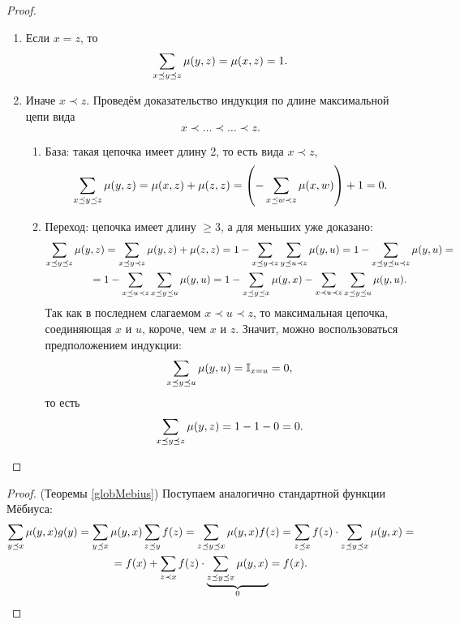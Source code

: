 \begin{proof}~
	\begin{enumerate}
		\item Если $x = z$, то
		\[
			\sum\limits_{x \preceq y \preceq z} \mu(y, z) = \mu(x, z) = 1.
		\]
		
		\item Иначе $x \prec z$. Проведём доказательство индукция по длине максимальной цепи вида
		\[
			x \prec \ldots \prec \ldots \prec z.
		\]
		\begin{enumerate}
			\item База: такая цепочка имеет длину 2, то есть вида $x \prec z$,
			\[
				\sum\limits_{x \preceq y \preceq z} \mu(y, z) = \mu(x, z) + \mu(z, z) = \left(-\sum\limits_{x \preceq w \prec z} \mu(x, w)\right) + 1 = 0.
			\]
			
			\item Переход: цепочка имеет длину $\ge 3$, а для меньших уже доказано:
			\begin{multline*}
				\sum\limits_{x \preceq y \preceq z} \mu(y, z) = \sum\limits_{x \preceq y \prec z} \mu(y, z) + \mu(z, z) = 1 - \sum\limits_{x \preceq y \prec z} \sum\limits_{y \preceq u \prec z} \mu(y, u) = 1 - \sum\limits_{x \preceq y \preceq u \prec z} \mu(y, u) =
				\\ =
				1 - \sum\limits_{x \preceq u \prec z} \sum\limits_{x \preceq y \preceq u} \mu(y, u) = 1 - \sum\limits_{x \preceq y \preceq x} \mu(y, x) - \sum\limits_{x \prec u \prec z} \sum\limits_{x \preceq y \preceq u} \mu(y, u).
			\end{multline*}
			Так как в последнем слагаемом $x \prec u \prec z$, то максимальная цепочка, соединяющая $x$ и $u$, короче, чем $x$ и $z$. Значит, можно воспользоваться предположением индукции:
			\[
				\sum\limits_{x \preceq y \preceq u} \mu(y, u) = \mathbb{I}_{x = u} = 0,
			\]
			то есть
			\[
				\sum\limits_{x \preceq y \preceq z} \mu(y, z) = 1 - 1 - 0 = 0.
			\]
		\end{enumerate}
	\end{enumerate}
\end{proof}

\begin{proof} (Теоремы \ref{globMebius})
	Поступаем аналогично стандартной функции Мёбиуса:
	\begin{multline*}
		\sum\limits_{y \preceq x} \mu(y, x) g(y) = \sum\limits_{y \preceq x} \mu(y, x) \sum\limits_{z \preceq y} f(z) = \sum\limits_{z \preceq y \preceq x} \mu(y, x)f(z) = \sum\limits_{z \preceq x} f(z) \cdot \sum\limits_{z \preceq y \preceq x} \mu(y, x) =
		\\ =
		f(x) + \sum\limits_{z \prec x}f(z) \cdot  \underbrace{\sum\limits_{z \preceq y \preceq x} \mu(y, x)}_0 = f(x).
	\end{multline*}
\end{proof}